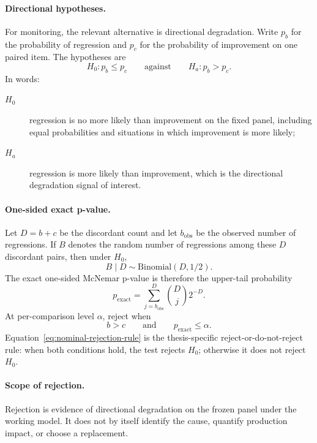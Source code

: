 \paragraph{Directional hypotheses.}

For monitoring, the relevant alternative is directional degradation. Write \(p_b\) for the probability of regression and \(p_c\) for the probability of improvement on one paired item. The hypotheses are
\begin{equation}
H_0:p_b\le p_c
\qquad\text{against}\qquad
H_a:p_b>p_c.
\label{eq:mcnemar-hypotheses}
\end{equation}
In words:
\begin{description}
    \item[\(H_0\)] regression is no more likely than improvement on the fixed panel, including equal probabilities and situations in which improvement is more likely;
    \item[\(H_a\)] regression is more likely than improvement, which is the directional degradation signal of interest.
\end{description}

\paragraph{One-sided exact p-value.}

Let \(D=b+c\) be the discordant count and let \(b_{\mathrm{obs}}\) be the observed number of regressions. If \(B\) denotes the random number of regressions among these \(D\) discordant pairs, then under \(H_0\),
\[
    B\mid D\sim\mathrm{Binomial}(D,1/2).
\]
The exact one-sided McNemar p-value is therefore the upper-tail probability
\[
p_{\mathrm{exact}}
=
\sum_{j=b_{\mathrm{obs}}}^{D}\binom{D}{j}2^{-D}.
\]
At per-comparison level \(\alpha\), reject when
\begin{equation}
    b>c
    \qquad\text{and}\qquad
    p_{\mathrm{exact}}\le\alpha.
    \label{eq:nominal-rejection-rule}
\end{equation}
Equation~\eqref{eq:nominal-rejection-rule} is the thesis-specific reject-or-do-not-reject rule: when both conditions hold, the test rejects \(H_0\); otherwise it does not reject \(H_0\). 

\paragraph{Scope of rejection.}

Rejection is evidence of directional degradation on the frozen panel under the working model. It does not by itself identify the cause, quantify production impact, or choose a replacement.

